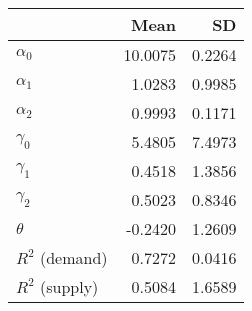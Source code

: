 
\begin{tabular}[t]{lrr}
\toprule
  & Mean & SD\\
\midrule
$\alpha_{0}$ & 10.0075 & 0.2264\\
$\alpha_{1}$ & 1.0283 & 0.9985\\
$\alpha_{2}$ & 0.9993 & 0.1171\\
$\gamma_{0}$ & 5.4805 & 7.4973\\
$\gamma_{1}$ & 0.4518 & 1.3856\\
$\gamma_{2}$ & 0.5023 & 0.8346\\
$\theta$ & -0.2420 & 1.2609\\
$R^{2}$ (demand) & 0.7272 & 0.0416\\
$R^{2}$ (supply) & 0.5084 & 1.6589\\
\bottomrule
\end{tabular}
